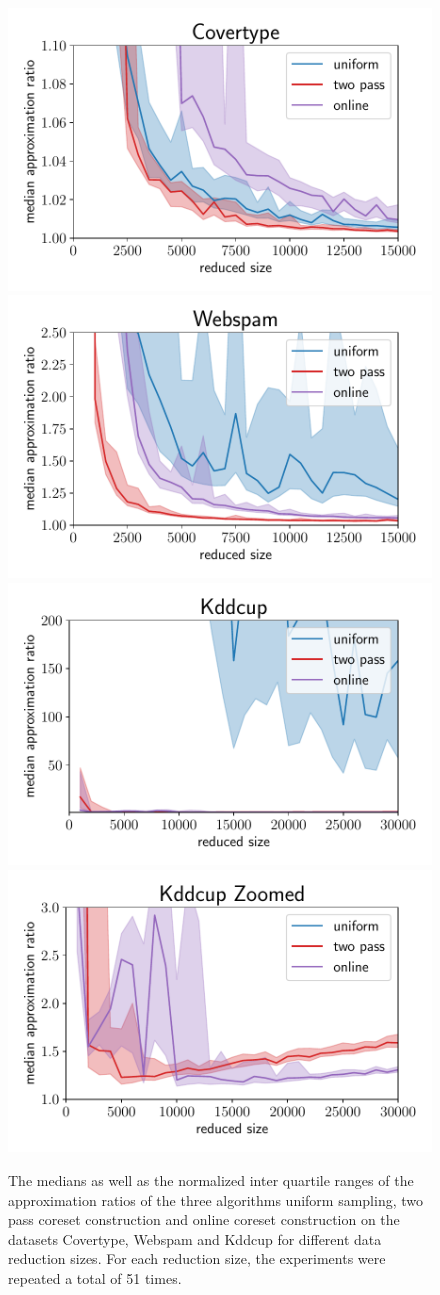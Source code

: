\begin{figure}[t!]
    \centering
    \includegraphics[width=.49\linewidth]{figures/covertype_ratio_plot.pdf}
    \includegraphics[width=.49\linewidth]{figures/webspam_ratio_plot.pdf}
    \includegraphics[width=.49\linewidth]{figures/kddcup_ratio_plot.pdf}
    \includegraphics[width=.49\linewidth]{figures/kddcup_ratio_plot_zoomed.pdf}
    \caption{The medians as well as the normalized inter quartile
        ranges of the approximation ratios of the three
        algorithms uniform sampling, two pass coreset construction and
        online coreset construction on the datasets Covertype, Webspam
        and Kddcup for different data reduction sizes.
        For each reduction size, the experiments were repeated a
        total of 51 times.}
    \label{fig:ratio-plots}
\end{figure}

